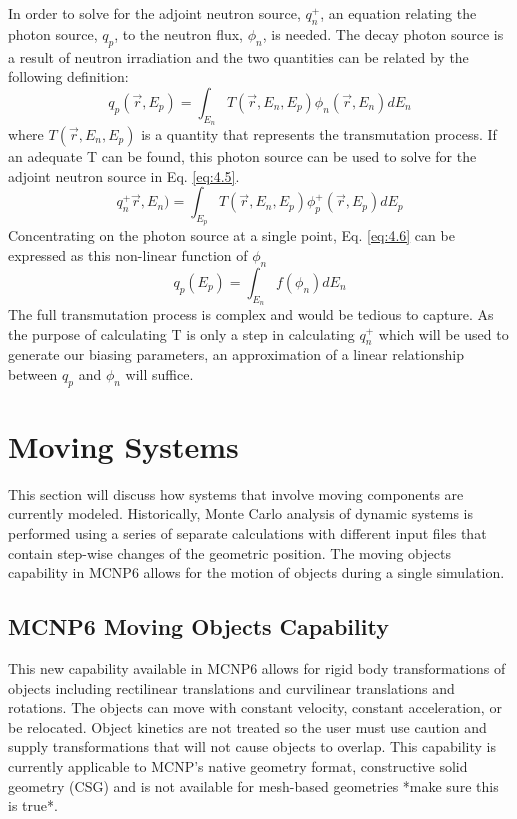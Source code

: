 In order to solve for the adjoint neutron source, $q_n^{+}$, an equation
relating the photon source, $q_p$, to the neutron flux, $\phi_n$, is needed.
The decay photon source is a result of neutron irradiation and 
the two quantities can be related by the following
definition:
\begin{equation} \label{eq:4.6}
	q_p(\overrightarrow{r}, E_{p}) = 
	\int_{E_n}T(\overrightarrow{r}, E_{n}, E_{p})
	\phi_{n}(\overrightarrow{r}, E_{n}) dE_{n}
\end{equation}
where $T(\overrightarrow{r}, E_{n}, E_{p})$ is a quantity that represents the
transmutation process.  If an adequate T can be found, this photon source can
be used to solve for the adjoint neutron source in Eq. \ref{eq:4.5}.
\begin{equation} \label{eq:4.7}
        q_{n}^{+}\overrightarrow{r},E_{n})
        = \int_{E_p}T(\overrightarrow{r}, E_{n}, E_{p})
	\phi_{p}^{+}(\overrightarrow{r}, E_{p}) dE_{p}
\end{equation}
Concentrating on the photon source at a single point, Eq. \ref{eq:4.6} can be
expressed as this non-linear function of $\phi_n$ 
\begin{equation} \label{eq:4.8}
	q_{p}(E_{p}) = \int_{E_n} f(\phi_{n}) dE_{n}
\end{equation}
The full transmutation process is complex and would be
tedious to capture.  As the purpose of calculating T is only a step in
calculating $q_{n}^{+}$ which will be used to generate our biasing parameters,
an approximation of a linear relationship between $q_p$ and $\phi_n$ will suffice.  


\section{Moving Systems} \label{sec:moving_sys}
This section will discuss how systems that involve moving components are
currently modeled.
Historically, Monte Carlo analysis of dynamic systems is performed using a series of separate
calculations with different input files that contain step-wise changes of the
geometric position.  The moving objects capability in MCNP6 allows for the
motion of objects during a single simulation.

\subsection{MCNP6 Moving Objects Capability} \label{sec:mcnp_move}
This new capability available in MCNP6 allows for rigid body transformations of
objects
including rectilinear translations and curvilinear translations and rotations.
The objects can move with constant velocity, constant acceleration, or be
relocated.
Object kinetics are not treated so the user must use caution and supply
transformations that will not cause objects to overlap.
This capability is currently applicable to MCNP's native geometry format,
constructive solid geometry (CSG) and is not available for mesh-based
geometries *make sure this is true*.

